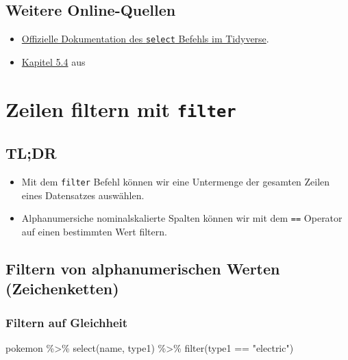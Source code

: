 \documentclass[
]{book}
\newenvironment{Shaded}{\begin{snugshade}}{\end{snugshade}}
\newcommand{\FunctionTok}[1]{\textcolor[rgb]{0.00,0.00,0.00}{#1}}
\newcommand{\NormalTok}[1]{#1}
\newcommand{\SpecialCharTok}[1]{\textcolor[rgb]{0.00,0.00,0.00}{#1}}
\newcommand{\StringTok}[1]{\textcolor[rgb]{0.31,0.60,0.02}{#1}}
\providecommand{\tightlist}{%
  \setlength{\itemsep}{0pt}\setlength{\parskip}{0pt}}
\begin{document}
\hypertarget{weitere-online-quellen}{%
\section{Weitere Online-Quellen}\label{weitere-online-quellen}}

\begin{itemize}
\tightlist
\item
  \href{https://dplyr.tidyverse.org/reference/select.html}{Offizielle Dokumentation des \texttt{select} Befehls im Tidyverse}.
\item
  \href{https://r4ds.had.co.nz/transform.html\#select}{Kapitel 5.4} aus \citet{wickham_r_2016}
\end{itemize}

\hypertarget{zeilen-filtern-mit-filter}{%
\chapter{\texorpdfstring{Zeilen filtern mit \texttt{filter}}{Zeilen filtern mit filter}}\label{zeilen-filtern-mit-filter}}

\hypertarget{tldr-4}{%
\section*{TL;DR}\label{tldr-4}}

\begin{itemize}
\tightlist
\item
  Mit dem \texttt{filter} Befehl können wir eine Untermenge der gesamten Zeilen eines Datensatzes auswählen.
\item
  Alphanumersiche nominalskalierte Spalten können wir mit dem \texttt{==} Operator auf einen bestimmten Wert filtern.
\end{itemize}

\hypertarget{filtern-von-alphanumerischen-werten-zeichenketten}{%
\section{Filtern von alphanumerischen Werten (Zeichenketten)}\label{filtern-von-alphanumerischen-werten-zeichenketten}}

\hypertarget{filtern-auf-gleichheit}{%
\subsection{Filtern auf Gleichheit}\label{filtern-auf-gleichheit}}

\begin{Shaded}
\begin{Highlighting}[]
\NormalTok{pokemon }\SpecialCharTok{\%\textgreater{}\%}
  \FunctionTok{select}\NormalTok{(name, type1) }\SpecialCharTok{\%\textgreater{}\%}
  \FunctionTok{filter}\NormalTok{(type1 }\SpecialCharTok{==} \StringTok{"electric"}\NormalTok{)}
\end{Highlighting}
\end{Shaded}
\end{document}
